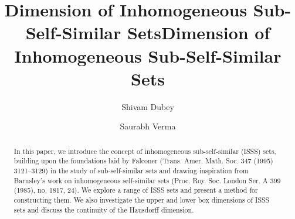 \documentclass[12pt,oneside,reqno]{amsart}
\title[]{Dimension of Inhomogeneous Sub-Self-Similar Sets}
\title{Dimension of Inhomogeneous Sub-Self-Similar Sets}
\author{Shivam Dubey}
\author{Saurabh Verma}
\theoremstyle{definition}
\theoremstyle{remark}
\begin{document}
\maketitle

\vspace{-1em}

\begin{abstract}
In this paper, we introduce the concept of inhomogeneous sub-self-similar (ISSS) sets, building upon the foundations laid by Falconer (Trans. Amer. Math. Soc. 347 (1995) 3121–3129) in the study of sub-self-similar sets and drawing inspiration from Barnsley's work on inhomogeneous self-similar sets (Proc. Roy. Soc. London Ser. A 399 (1985), no. 1817, 24). We explore a range of ISSS sets and present a method for constructing them. We also investigate the upper and lower box dimensions of ISSS sets and discuss the continuity of the Hausdorff dimension.
\end{abstract}




\end{document}
